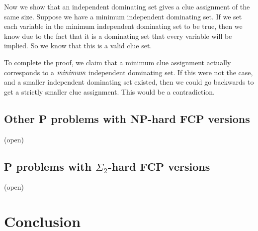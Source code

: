 \documentclass[runningheads,a4paper]{llncs}
\begin{document}
Now we show that an independent dominating set gives a clue assignment of the same size. Suppose we have a minimum independent dominating set. If we set each variable in the minimum independent dominating set to be true, then we know due to the fact that it is a dominating set that every variable will be implied. So we know that this is a valid clue set.

To complete the proof, we claim that a minimum clue assignment actually corresponds to a $\emph{minimum}$ independent dominating set. If this were not the case, and a smaller independent dominating set existed, then we could go backwards to get a strictly smaller clue assignment. This would be a contradiction. 

\subsection{Other P problems with NP-hard FCP versions}

(open)

\subsection{P problems with $\Sigma_2$-hard FCP versions}

(open)

\section{Conclusion}
\label{sec:conclusion}




\end{document}
